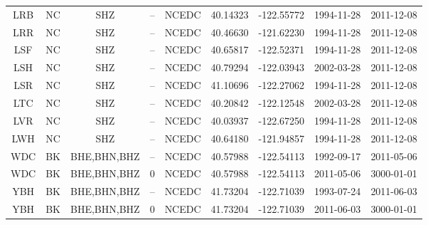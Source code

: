 \documentclass{article}
\begin{document}
\begin{table}
\begin{tabular}{c c c c c c c c c}
LRB & NC & SHZ & -- & NCEDC & 40.14323 & -122.55772 & 1994-11-28 & 2011-12-08 \\
LRR & NC & SHZ & -- & NCEDC & 40.46630 & -121.62230 & 1994-11-28 & 2011-12-08 \\
LSF & NC & SHZ & -- & NCEDC & 40.65817 & -122.52371 & 1994-11-28 & 2011-12-08 \\
LSH & NC & SHZ & -- & NCEDC & 40.79294 & -122.03943 & 2002-03-28 & 2011-12-08 \\
LSR & NC & SHZ & -- & NCEDC & 41.10696 & -122.27062 & 1994-11-28 & 2011-12-08 \\
LTC & NC & SHZ & -- & NCEDC & 40.20842 & -122.12548 & 2002-03-28 & 2011-12-08 \\
LVR & NC & SHZ & -- & NCEDC & 40.03937 & -122.67250 & 1994-11-28 & 2011-12-08 \\
LWH & NC & SHZ & -- & NCEDC & 40.64180 & -121.94857 & 1994-11-28 & 2011-12-08 \\
WDC & BK & BHE,BHN,BHZ & -- & NCEDC & 40.57988 & -122.54113 & 1992-09-17 & 2011-05-06 \\
WDC & BK & BHE,BHN,BHZ & 0 & NCEDC & 40.57988 & -122.54113 & 2011-05-06 & 3000-01-01 \\
YBH & BK & BHE,BHN,BHZ & -- & NCEDC & 41.73204 & -122.71039 & 1993-07-24 & 2011-06-03 \\
YBH & BK & BHE,BHN,BHZ & 0 & NCEDC & 41.73204 & -122.71039 & 2011-06-03 & 3000-01-01 \\
\hline
\end{tabular}
\end{table}
\end{document}
